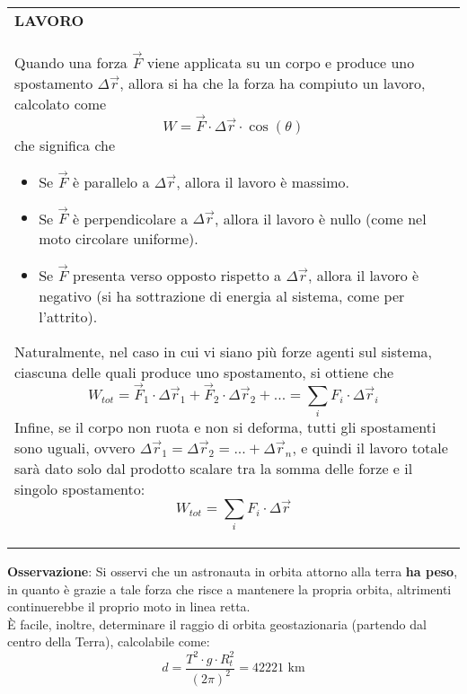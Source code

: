 \documentclass[a4paper]{extarticle}
\renewcommand\arraystretch{}
\begin{document}
\vspace{1em}
\setlength{\tabcolsep}{14pt}
\renewcommand{\arraystretch}{2}
\noindent
\begin{tabularx}{\textwidth}{@{}|P|@{}}
    \hline
    {\textbf{LAVORO}}\\
    \parbox{\linewidth}{Quando una forza $\vec F$ viene applicata su un corpo e produce uno spostamento $\Delta \vec r$, allora si ha che la forza ha compiuto un lavoro, calcolato come
    \[\boxed{W = \vec F \cdot \Delta \vec r \cdot \cos(\theta)}\]
    che significa che
    \begin{itemize}
      \item Se $\vec F$ è parallelo a $\Delta \vec r$, allora il lavoro è massimo.
      \item Se $\vec F$ è perpendicolare a $\Delta \vec r$, allora il lavoro è nullo (come nel moto circolare uniforme).
      \item Se $\vec F$ presenta verso opposto rispetto a $\Delta \vec r$, allora il lavoro è negativo (si ha sottrazione di energia al sistema, come per l'attrito).
    \end{itemize}
    Naturalmente, nel caso in cui vi siano più forze agenti sul sistema, ciascuna delle quali produce uno spostamento, si ottiene che
    \[W_{tot} = \vec F_1 \cdot \Delta \vec r_1 + \vec F_2 \cdot \Delta \vec r_2 + ... = \sum_{i} F_i \cdot \Delta \vec r_i\]
    Infine, se il corpo non ruota e non si deforma, tutti gli spostamenti sono uguali, ovvero $\Delta \vec r_1 = \Delta \vec r_2 = ... + \Delta \vec r_n$, e quindi il lavoro totale sarà dato solo dal prodotto scalare tra la somma delle forze e il singolo spostamento:
    \[W_{tot} = \sum_{i} F_i \cdot \Delta \vec r\]
    \vspace{-1mm}}\\
    \hline
\end{tabularx}

\vspace{2em}
\noindent
\textbf{Osservazione}: Si osservi che un astronauta in orbita attorno alla terra \textbf{ha peso}, in quanto è grazie a tale forza che risce a mantenere la propria orbita, altrimenti continuerebbe il proprio moto in linea retta.\\
È facile, inoltre, determinare il raggio di orbita geostazionaria (partendo dal centro della Terra), calcolabile come:
\[d=\frac{T^2 \cdot g \cdot R_t^2}{(2 \pi)^2} = 42 221 \text{ km}\]

\vspace{1em}
\end{document}
